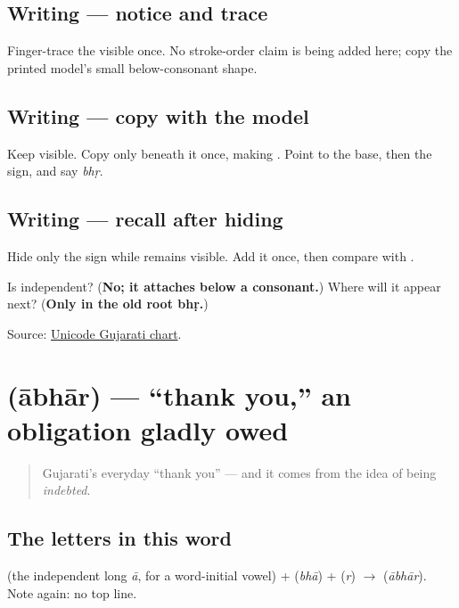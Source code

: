 \subsection*{Writing — notice and trace}
Finger-trace the visible \textbf{} once. No stroke-order claim is being added here; copy the printed model's small below-consonant shape.

\subsection*{Writing — copy with the model}
Keep \textbf{} visible. Copy only \textbf{} beneath it once, making \textbf{}. Point to the base, then the sign, and say \emph{bhṛ}.

\subsection*{Writing — recall after hiding}
Hide only the sign while \textbf{} remains visible. Add it once, then compare with \textbf{}.

\begin{tcolorbox}[breakable,colback=teal!4,colframe=teal!35!black,title={Before you move on}]
Is \textbf{} independent? (\textbf{No; it attaches below a consonant.}) Where will it appear next? (\textbf{Only in the old root bhṛ.})

Source: \href{https://www.unicode.org/charts/PDF/U0A80.pdf}{Unicode Gujarati chart}.
\end{tcolorbox}
\section[\texorpdfstring{\gu{આભાર} (ābhār)}{આભાર (ābhār)}]{ (ābhār) — \textquotedblleft{}thank you,\textquotedblright{} an obligation gladly owed}

\label{lesson:GU-C01-aabhaar}



\begin{quote}
Gujarati's everyday \textquotedblleft{}thank you\textquotedblright{} — and it comes from the idea of being \emph{indebted}.
\end{quote}

\subsection*{The letters in this word}
\textbf{} (the independent long \emph{ā}, for a word-initial vowel) + \textbf{} (\emph{bhā}) + \textbf{} (\emph{r}) $\to$ \textbf{} (\emph{ābhār}). Note again: no top line.

